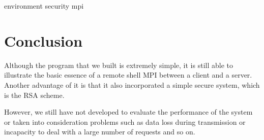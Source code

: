 \documentclass{report}
\begin{document}
{environment}
{security}
{mpi}

\section{Conclusion}

Although the program that we built is extremely simple, it is still able to illustrate the basic essence of a remote shell MPI between a client and a server. Another advantage of it is that it also incorporated a simple secure system, which is the RSA scheme.

However, we still have not developed to evaluate the performance of the system or taken into consideration problems such as data loss during transmission or incapacity to deal with a large number of requests and so on.

\printbibliography
\end{document}
